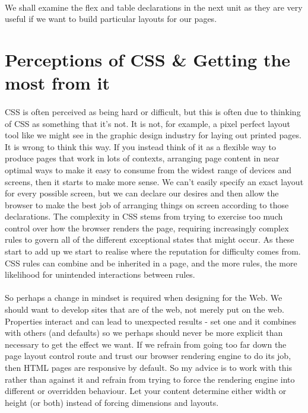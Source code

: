 \paragraph{} We shall examine the flex and table declarations in the next unit as they are very useful if we want to build particular layouts for our pages.



\section{Perceptions of CSS \& Getting the most from it}
\paragraph{} CSS is often perceived as being hard or difficult, but this is often due to thinking of CSS as something that it’s not. It is not, for example, a pixel perfect layout tool like we might see in the graphic design industry for laying out printed pages. It is wrong to think this way. If you instead think of it as a flexible way to produce pages that work in lots of contexts, arranging page content in near optimal ways to make it easy to consume from the widest range of devices and screens, then it starts to make more sense. We can't easily specify an exact layout for every possible screen, but we can declare our desires and then allow the browser to make the best job of arranging things on screen according to those declarations. The complexity in CSS stems from trying to exercise too much control over how the browser renders the page, requiring increasingly complex rules to govern all of the different exceptional states that might occur. As these start to add up we start to realise where the reputation for difficulty comes from. CSS rules can combine and be inherited in a page, and the more rules, the more likelihood for unintended interactions between rules.
\paragraph{} So perhaps a change in mindset is required when designing for the Web. We should want to develop sites that are of the web, not merely put on the web. Properties interact and can lead to unexpected results - set one and it combines with others (and defaults) so we perhaps should never be more explicit than necessary to get the effect we want. If we refrain from going too far down the page layout control route and trust our browser rendering engine to do its job, then HTML pages are responsive by default. So my advice is to work with this rather than against it and refrain from trying to force the rendering engine into different or overridden behaviour. Let your content determine either width or height (or both) instead of forcing dimensions and layouts. 

